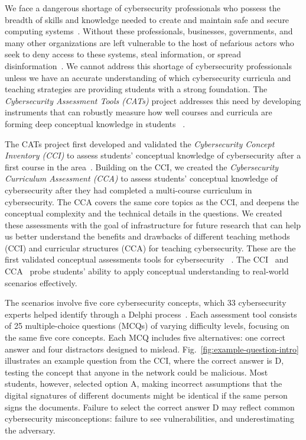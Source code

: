 \documentclass{uofithesis}
\begin{document}
We face a dangerous shortage of cybersecurity professionals who possess the breadth of skills and knowledge needed to create and maintain safe and secure computing systems~\cite{hackers_wanted,cybersecurityshortage}. Without these professionals, businesses, governments, and many other organizations are left vulnerable to the host of nefarious actors who seek to deny access to these systems, steal information, or spread disinformation~\cite{topsecuritybreaches}. We cannot address this shortage of cybersecurity professionals unless we have an accurate understanding of which cybersecurity curricula and teaching strategies are providing students with a strong foundation. The 
{\it Cybersecurity Assessment Tools (CATs)} project addresses this need by developing instruments that can robustly measure how well courses and curricula are forming deep conceptual knowledge in students ~\cite{delphi,MisconceptionCyber,scenarios,status, hackathon,CCIeval,cybersummit,sherman2020experiences}.

The CATs project first developed and validated the {\it Cybersecurity Concept Inventory (CCI)} to assess students' conceptual knowledge of cybersecurity after a first course in the area~\cite{CCIeval}. Building on the CCI, we created the {\it Cybersecurity Curriculum Assessment (CCA)} to assess students' conceptual knowledge of cybersecurity after they had completed a multi-course curriculum in cybersecurity. The CCA covers the same core topics as the CCI, and deepens the conceptual complexity and the technical details in the questions. We created these assessments with the goal of infrastructure for future research that can help us better understand the benefits and drawbacks of different teaching methods (CCI) and curricular structures (CCA) for teaching cybersecurity. These are the first validated conceptual assessments tools for cybersecurity ~\cite{CCIeval}.
The CCI~\cite{CCIeval} and CCA~\cite{CCA} probe students' ability
to apply conceptual understanding to real-world scenarios effectively. 

The scenarios involve five core cybersecurity concepts, which 
33 cybersecurity experts helped identify 
through a Delphi process~\cite{AT_Core}.
Each assessment tool consists of 25 multiple-choice questions (MCQs) of varying difficulty levels, focusing on the same five core concepts. Each MCQ includes five alternatives: one correct answer and four distractors designed to mislead. 
Fig.~\ref{fig:example-question-intro} illustrates an example question from the CCI, where the correct answer is D, testing the concept that anyone in the network could be malicious. 
Most students, however, selected option A, making incorrect assumptions that the digital signatures of different documents might be identical
if the same person signs the documents.
Failure to select the correct answer D may reflect common cybersecurity misconceptions: failure to see vulnerabilities, 
and underestimating the adversary.
\end{document}
